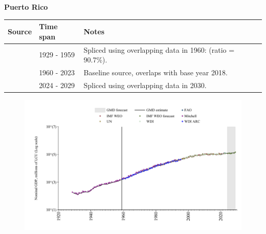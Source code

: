 \documentclass[12pt,a4paper,landscape]{article}
\begin{document}
\begin{adjustbox}{max totalsize={\paperwidth}{\paperheight},center}
\begin{minipage}[t][\textheight][t]{\textwidth}
\vspace*{0.5cm}
{}
\begin{center}
{\Large\bfseries Puerto Rico}
\end{center}
\vspace{0.5cm}
\begin{table}[H]
\centering
\small
\begin{tabular}{|l|l|l|}
\hline
\textbf{Source} & \textbf{Time span} & \textbf{Notes} \\
\hline
\rowcolor{white}\cite{Mitchell}& 1929 - 1959 &Spliced using overlapping data in 1960: (ratio = 90.7\%).\\
\rowcolor{lightgray}\cite{WDI}& 1960 - 2023 &Baseline source, overlaps with base year 2018.\\
\rowcolor{white}\cite{IMF_WEO_forecast}& 2024 - 2029 &Spliced using overlapping data in 2030.\\
\hline
\end{tabular}
\end{table}
\begin{figure}[H]
\centering
\includegraphics[width=\textwidth,height=0.6\textheight,keepaspectratio]{graphs/PRI_nGDP.pdf}
\end{figure}
\end{minipage}
\end{adjustbox}
\end{document}
